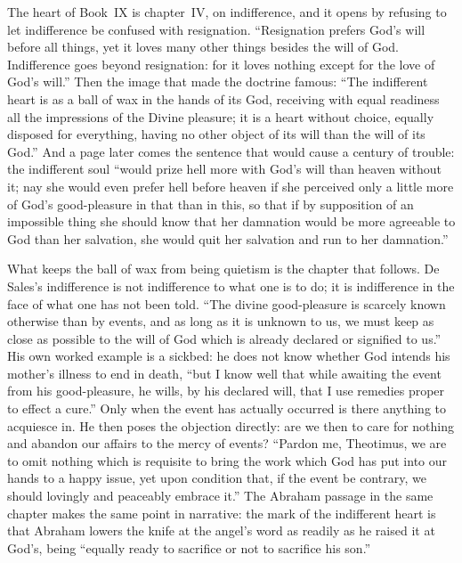 The heart of Book~IX is chapter~IV, on indifference, and it opens by refusing to let indifference be confused with resignation. ``Resignation prefers God's will before all things, yet it loves many other things besides the will of God. Indifference goes beyond resignation: for it loves nothing except for the love of God's will.'' Then the image that made the doctrine famous: ``The indifferent heart is as a ball of wax in the hands of its God, receiving with equal readiness all the impressions of the Divine pleasure; it is a heart without choice, equally disposed for everything, having no other object of its will than the will of its God.'' And a page later comes the sentence that would cause a century of trouble: the indifferent soul ``would prize hell more with God's will than heaven without it; nay she would even prefer hell before heaven if she perceived only a little more of God's good-pleasure in that than in this, so that if by supposition of an impossible thing she should know that her damnation would be more agreeable to God than her salvation, she would quit her salvation and run to her damnation.''

What keeps the ball of wax from being quietism is the chapter that follows. De Sales's indifference is not indifference to what one is to do; it is indifference in the face of what one has not been told. ``The divine good-pleasure is scarcely known otherwise than by events, and as long as it is unknown to us, we must keep as close as possible to the will of God which is already declared or signified to us.'' His own worked example is a sickbed: he does not know whether God intends his mother's illness to end in death, ``but I know well that while awaiting the event from his good-pleasure, he wills, by his declared will, that I use remedies proper to effect a cure.'' Only when the event has actually occurred is there anything to acquiesce in. He then poses the objection directly: are we then to care for nothing and abandon our affairs to the mercy of events? ``Pardon me, Theotimus, we are to omit nothing which is requisite to bring the work which God has put into our hands to a happy issue, yet upon condition that, if the event be contrary, we should lovingly and peaceably embrace it.'' The Abraham passage in the same chapter makes the same point in narrative: the mark of the indifferent heart is that Abraham lowers the knife at the angel's word as readily as he raised it at God's, being ``equally ready to sacrifice or not to sacrifice his son.''

